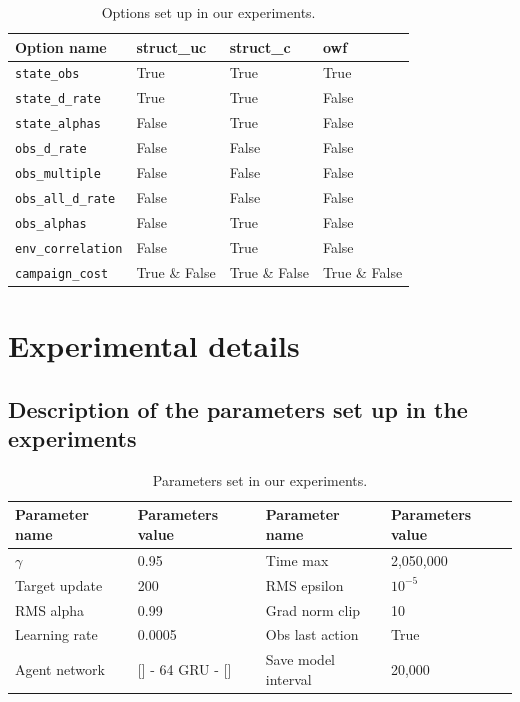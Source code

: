 \begin{table}
\centering
\caption{Options set up in our experiments.}
\label{tab:ouroptionvlaues}
\setlength\tabcolsep{4.5pt}
\begin{tabular}{llll}
\toprule
Option name & struct\_uc & struct\_c & owf \\
\midrule
\texttt{state\_obs} & True & True & True \\
\texttt{state\_d\_rate} & True & True & False \\
\texttt{state\_alphas} & False & True & False \\
\texttt{obs\_d\_rate} & False & False & False \\
\texttt{obs\_multiple} & False & False & False \\
\texttt{obs\_all\_d\_rate} & False & False & False \\
\texttt{obs\_alphas} & False & True & False \\
\texttt{env\_correlation} & False & True & False \\
\texttt{campaign\_cost} & True \& False & True \& False & True \& False \\
\bottomrule
\end{tabular}
\end{table}

\newpage
\section{Experimental details}
\label{sec:ch5_appendix_exp_details}
\subsection{Description of the parameters set up in the experiments}
\label{sec:ch5_appendix_param}
\begin{table}
  \caption{Parameters set in our experiments.}
  \label{tab:exp_details_common}
  \centering
  \setlength\tabcolsep{4.5pt}
  \begin{tabular}{llll}
    \toprule
    Parameter name & Parameters value & Parameter name & Parameters value \\
    \midrule
    $\gamma$ & 0.95 & Time max & 2,050,000 \\
    Target update & 200  & RMS epsilon &  $10^{-5}$ \\
    RMS alpha &  0.99  & Grad norm clip & 10 \\
    Learning rate & 0.0005 &Obs last action & True \\
    Agent network & [] - 64 GRU - [] &Save model interval & 20,000 \\
    \bottomrule
  \end{tabular}
\end{table}


